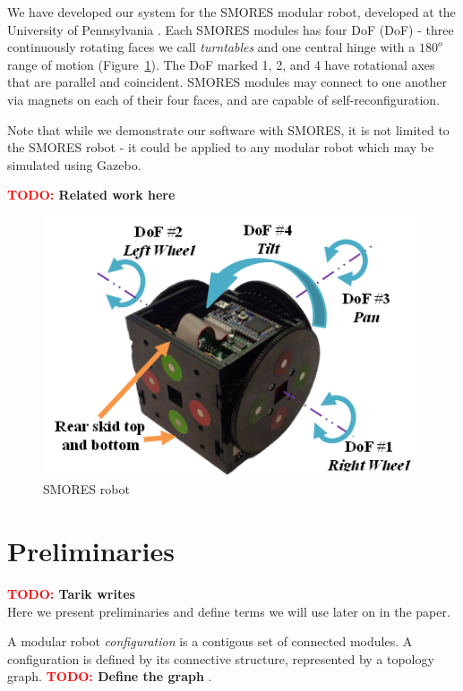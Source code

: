 \documentclass[conference]{IEEEtran}
\newcommand{\TODO}[1]{ {\bf \textcolor{red}{TODO:} #1 }}
\begin{document}
We have developed our system for the SMORES modular robot, developed at the University of Pennsylvania \cite{Davey2012}. Each SMORES modules has four DoF (DoF) - three continuously rotating faces we call {\em turntables} and one central hinge with a $180^o$ range of motion (Figure~\ref{fig:SmoresRobot}). The DoF marked 1, 2, and 4 have rotational axes that are parallel and coincident. SMORES modules may connect to one another via magnets on each of their four faces, and are capable of  self-reconfiguration.

Note that while we demonstrate our software with SMORES, it is not limited to the SMORES robot - it could be applied to any modular robot which may be simulated using Gazebo.

\TODO{Related work here}


\begin{figure}[tb]
    \begin{center}
        \includegraphics[width=\columnwidth]{images/smores_robot.png}
    \end{center}
    \caption{SMORES robot}
    \label{fig:SmoresRobot}
\end{figure}

\section{Preliminaries}
\TODO{Tarik writes}\\
Here we present preliminaries and define terms we will use later on in the paper.

A modular robot \textit{configuration} is a contigous set of connected modules.  A configuration is defined by its connective structure, represented by a topology graph. \TODO{Define the graph}.
\end{document}
